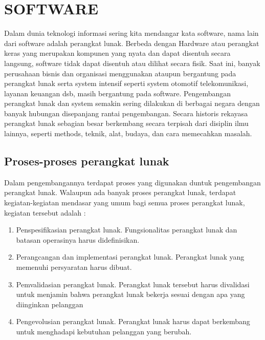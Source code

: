 \section{SOFTWARE}
Dalam dunia teknologi informasi sering kita mendangar kata software, nama lain dari software adalah perangkat lunak. Berbeda dengan Hardware atau perangkat keras yang merupakan kompunen yang nyata dan dapat disentuh secara langsung, software tidak dapat disentuh atau dilihat secara fisik. Saat ini, banyak perusahaan bisnis dan organisasi menggunakan ataupun bergantung pada perangkat lunak serta system intensif seperti system otomotif telekomunikasi, layanan keuangan dsb, masih bergantung pada software.
	Pengembangan perangkat lunak dan system semakin sering dilakukan di berbagai negara dengan banyak hubungan disepanjang rantai pengembangan. Secara historis rekayasa perangkat lunak sebagian besar berkembang secara terpisah dari disiplin ilmu lainnya, seperti methods, teknik, alat, budaya, dan cara memecahkan masalah.
\subsection{Proses-proses perangkat lunak}
Dalam pengembangannya terdapat proses yang digunakan duntuk pengembangan perangkat lunak. Walaupun ada banyak proses perangkat lunak, terdapat kegiatan-kegiatan mendasar yang umum bagi semua proses perangkat lunak, kegiatan tersebut adalah :
\begin{enumerate}
\item Penspesifikasian perangkat lunak. Fungsionalitas perangkat lunak dan batasan operasinya harus didefinisikan.
\item Perangcangan dan implementasi perangkat lunak. Perangkat lunak yang memenuhi persyaratan harus dibuat.
\item Pemvalidasian perangkat lunak. Perangkat lunak tersebut harus divalidasi untuk menjamin bahwa perangkat lunak bekerja sesuai dengan apa yang diinginkan pelanggan
\item Pengevolusian perangkat lunak. Perangkat lunak harus dapat berkembang untuk menghadapi kebutuhan pelanggan yang berubah.
\end{enumerate}
